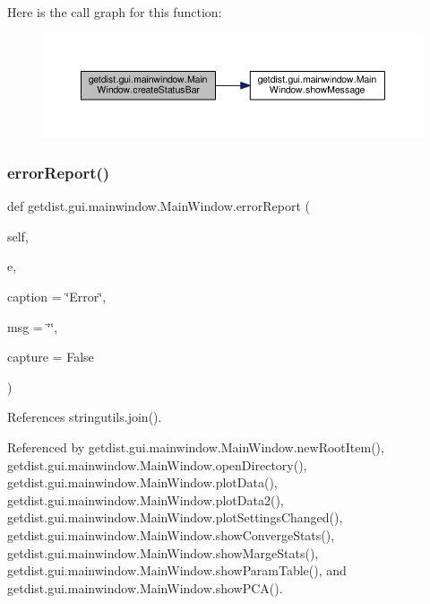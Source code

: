 Here is the call graph for this function\+:
\nopagebreak
\begin{figure}[H]
\begin{center}
\leavevmode
\includegraphics[width=350pt]{classgetdist_1_1gui_1_1mainwindow_1_1MainWindow_a4949f535773d57d42fce84ee2755afc8_cgraph}
\end{center}
\end{figure}
\mbox{\label{classgetdist_1_1gui_1_1mainwindow_1_1MainWindow_aa4d50e481a279bfc236264d54e794696}} 
\subsubsection{\texorpdfstring{error\+Report()}{errorReport()}}
{\footnotesize\ttfamily def getdist.\+gui.\+mainwindow.\+Main\+Window.\+error\+Report (\begin{DoxyParamCaption}\item[{}]{self,  }\item[{}]{e,  }\item[{}]{caption = {\ttfamily \char`\"{}Error\char`\"{}},  }\item[{}]{msg = {\ttfamily \char`\"{}\char`\"{}},  }\item[{}]{capture = {\ttfamily False} }\end{DoxyParamCaption})}



References stringutils.\+join().



Referenced by getdist.\+gui.\+mainwindow.\+Main\+Window.\+new\+Root\+Item(), getdist.\+gui.\+mainwindow.\+Main\+Window.\+open\+Directory(), getdist.\+gui.\+mainwindow.\+Main\+Window.\+plot\+Data(), getdist.\+gui.\+mainwindow.\+Main\+Window.\+plot\+Data2(), getdist.\+gui.\+mainwindow.\+Main\+Window.\+plot\+Settings\+Changed(), getdist.\+gui.\+mainwindow.\+Main\+Window.\+show\+Converge\+Stats(), getdist.\+gui.\+mainwindow.\+Main\+Window.\+show\+Marge\+Stats(), getdist.\+gui.\+mainwindow.\+Main\+Window.\+show\+Param\+Table(), and getdist.\+gui.\+mainwindow.\+Main\+Window.\+show\+P\+C\+A().

